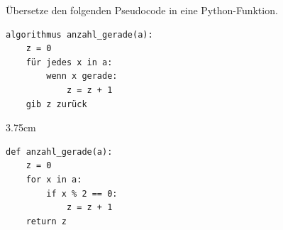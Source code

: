 \question[3]
Übersetze den folgenden Pseudocode in eine Python-Funktion.
\begin{lstlisting}[language={}]
algorithmus anzahl_gerade(a):
    z = 0
    für jedes x in a:
        wenn x gerade:
            z = z + 1
    gib z zurück
\end{lstlisting}
\begin{solutionbox}{3.75cm}
\begin{lstlisting}
def anzahl_gerade(a):
    z = 0
    for x in a:
        if x % 2 == 0:
            z = z + 1
    return z
\end{lstlisting}
\end{solutionbox}
